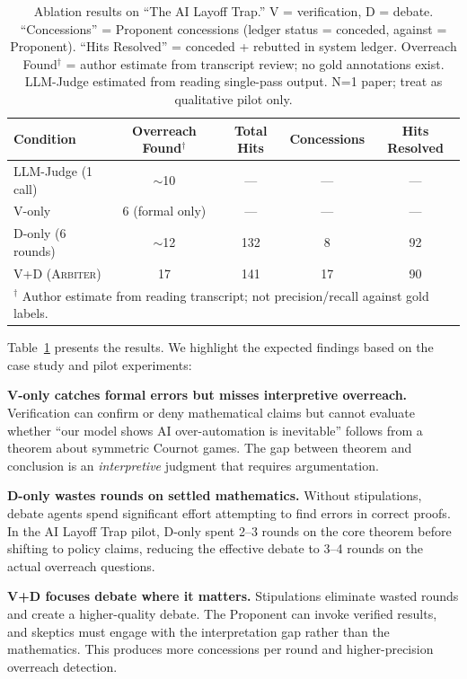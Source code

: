 \documentclass[11pt]{article}
\newcommand{\arbiter}{\textsc{Arbiter}}
\begin{document}
\begin{table}[t]
\centering
\caption{Ablation results on ``The AI Layoff Trap.'' V = verification, D = debate. ``Concessions'' = Proponent concessions (ledger status = conceded, against = Proponent). ``Hits Resolved'' = conceded + rebutted in system ledger. Overreach Found$^\dag$ = author estimate from transcript review; no gold annotations exist. LLM-Judge estimated from reading single-pass output. N=1 paper; treat as qualitative pilot only.}
\label{tab:ablation}
\begin{tabular}{@{}lcccc@{}}
\toprule
\textbf{Condition} & \textbf{Overreach Found$^\dag$} & \textbf{Total Hits} & \textbf{Concessions} & \textbf{Hits Resolved} \\
\midrule
LLM-Judge (1 call) & $\sim$10 & --- & --- & --- \\
V-only & 6 (formal only) & --- & --- & --- \\
D-only (6 rounds) & $\sim$12 & 132 & 8 & 92 \\
V+D (\arbiter{}) & 17 & 141 & 17 & 90 \\
\midrule
\multicolumn{5}{l}{$^\dag$ Author estimate from reading transcript; not precision/recall against gold labels.} \\
\bottomrule
\end{tabular}
\end{table}

Table~\ref{tab:ablation} presents the results.
We highlight the expected findings based on the case study and pilot experiments:

\textbf{V-only catches formal errors but misses interpretive overreach.}
Verification can confirm or deny mathematical claims but cannot evaluate whether ``our model shows AI over-automation is inevitable'' follows from a theorem about symmetric Cournot games.
The gap between theorem and conclusion is an \emph{interpretive} judgment that requires argumentation.

\textbf{D-only wastes rounds on settled mathematics.}
Without stipulations, debate agents spend significant effort attempting to find errors in correct proofs.
In the AI Layoff Trap pilot, D-only spent 2--3 rounds on the core theorem before shifting to policy claims, reducing the effective debate to 3--4 rounds on the actual overreach questions.

\textbf{V+D focuses debate where it matters.}
Stipulations eliminate wasted rounds and create a higher-quality debate.
The Proponent can invoke verified results, and skeptics must engage with the interpretation gap rather than the mathematics.
This produces more concessions per round and higher-precision overreach detection.
\end{document}
